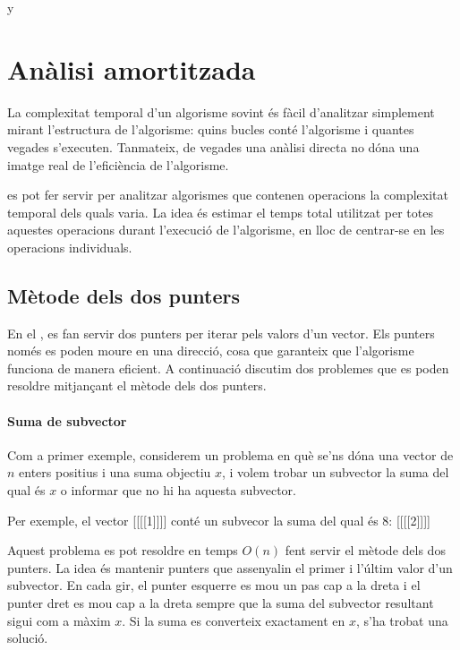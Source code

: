 y\chapter{Anàlisi amortitzada}


La complexitat temporal d'un algorisme sovint és fàcil d'analitzar
simplement mirant l'estructura de l'algorisme: quins bucles conté
l'algorisme i quantes vegades s'executen. Tanmateix, de
vegades una anàlisi directa no dóna una imatge real de l'eficiència
de l'algorisme.

 es pot fer servir per analitzar algorismes
que contenen operacions la complexitat temporal dels quals varia. La
idea és estimar el temps total utilitzat per totes aquestes
operacions durant l'execució de l'algorisme, en lloc de centrar-se en
les operacions individuals.

\section{Mètode dels dos punters}


En el , es fan servir dos punters per iterar
pels valors d'un vector. Els punters només es poden moure en una
direcció, cosa que garanteix que l'algorisme funciona de manera
eficient. A continuació discutim dos problemes que es poden resoldre
mitjançant el mètode dels dos punters.

\subsubsection{Suma de subvector}

Com a primer exemple, considerem un problema en què se'ns dóna una
vector de $n$ enters positius i una suma objectiu $x$, i volem trobar
un subvector la suma del qual és $x$ o informar que no hi ha aquesta
subvector.

Per exemple, el vector
[[[[1]]]]
conté un subvecor la suma del qual és 8:
[[[[2]]]]


Aquest problema es pot resoldre en temps $O(n)$ fent servir el mètode
dels dos punters. La idea és mantenir punters que assenyalin el primer
i l'últim valor d'un subvector. En cada gir, el punter esquerre es mou
un pas cap a la dreta i el punter dret es mou cap a la dreta sempre
que la suma del subvector resultant sigui com a màxim $x$. Si la suma
es converteix exactament en $x$, s'ha trobat una solució.

